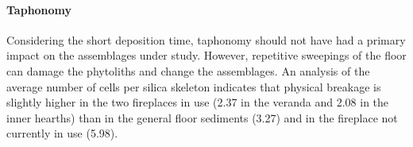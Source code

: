 \documentclass[authoryear,preprint,review,12pt]{elsarticle}
\begin{document}
\begin{table}[]
\centering
\caption{. Summary of the phytoliths and geochemical analyses. All values, except phytolith concentration, are given as percentages. Phytolith concentration is expressed as number of phytoliths per gram of Acid Insoluble Fraction (AIF) The full dataset is available for downloading at \protect\url{github.com/cl379/papers_supl_materials/tree/master/Lancelotti2015impr}.}
\end{table}

\paragraph{Taphonomy}
Considering the short deposition time, taphonomy should not have had a primary impact on the assemblages under study. However, repetitive sweepings of the floor can damage the phytoliths and change the assemblages. An analysis of the average number of cells per silica skeleton indicates that physical breakage is slightly higher in the two fireplaces in use (2.37 in the veranda and 2.08 in the inner hearths) than in the general floor sediments (3.27) and in the fireplace not currently in use (5.98).
\end{document}

